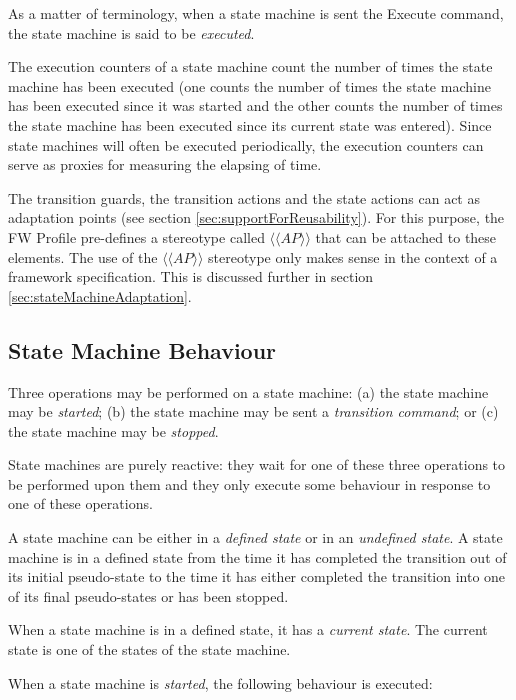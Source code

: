 \documentclass[a4paper,10pt]{article}
\begin{document}
As a matter of terminology, when a state machine is sent the Execute command, the state
machine is said to be \emph{executed}.

The execution counters of a state machine count the number of times the state machine has
been executed (one counts the number of times the state machine has been executed since it 
was started and the other counts the number of times the state machine has been executed
since its current state was entered). Since state machines will often be executed periodically,
the execution counters can serve as proxies for measuring the elapsing of time.

The transition guards, the transition actions and the state actions can act as adaptation points
(see section \ref{sec:supportForReusability}). 
For this purpose, the FW Profile pre-defines a stereotype called $\langle\langle AP \rangle\rangle$ that
can be attached to these elements. The use of the $\langle\langle AP \rangle\rangle$ stereotype only makes sense in the
context of a framework specification. This is discussed further in section \ref{sec:stateMachineAdaptation}.

\subsection{State Machine Behaviour}\label{sec:smBehaviour}
Three operations may be performed on a state machine: (a) the state machine may be \emph{started};
(b) the state machine may be sent a \emph{transition command}; or (c) the state machine may be
\emph{stopped}.

State machines are purely reactive: they wait for one of these three operations to be performed
upon them and they only execute some behaviour in response to one of these operations.

A state machine can be either in a \emph{defined state} or in an \emph{undefined state}. A state machine is in a
defined state from the time it has completed the transition out of its initial pseudo-state to the
time it has either completed the transition into one of its final pseudo-states or has been
stopped.

When a state machine is in a defined state, it has a \emph{current state}. The current state is one of the
states of the state machine.

When a state machine is \emph{started}, the following behaviour is executed:
\end{document}
